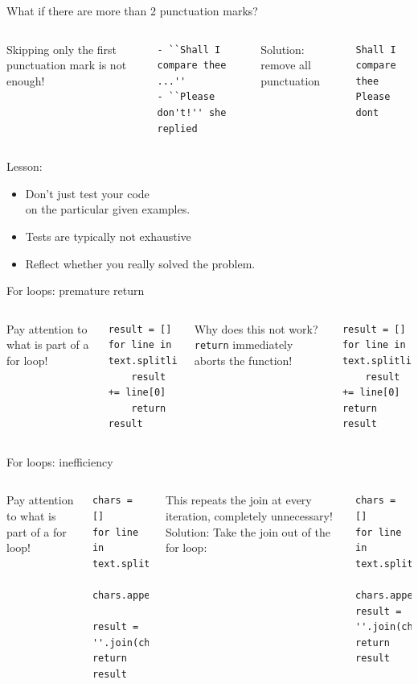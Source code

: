 \documentclass{beamer}
\begin{document}
\begin{frame}[fragile]{What if there are more than 2 punctuation marks?}
    \begin{columns}[T]
Skipping only the first punctuation mark is not enough!
\begin{lstlisting}[style=plain]
- ``Shall I compare thee ...''
- ``Please don't!'' she replied
\end{lstlisting} %
\pause{}
Solution: remove all punctuation
\begin{lstlisting}[style=plain]
Shall I compare thee
Please dont
\end{lstlisting}
\end{columns}
Lesson:
    \begin{itemize}
        \item Don't just test your code \\
            on the particular given examples.
        \item Tests are typically not exhaustive
        \item Reflect whether you really solved the problem.
    \end{itemize}
\end{frame}

\begin{frame}[fragile]{For loops: premature return}
\begin{columns}
Pay attention to what is part of a for loop!
\begin{lstlisting}
result = []
for line in text.splitlines():
    result += line[0]
    return result
\end{lstlisting}
Why does this not work?
\texttt{return} immediately aborts the function!
\pause{}
\begin{lstlisting}
result = []
for line in text.splitlines():
    result += line[0]
return result
\end{lstlisting}
\end{columns}
\end{frame}

\begin{frame}[fragile]{For loops: inefficiency}
\begin{columns}
Pay attention to what is part of a for loop!
\begin{lstlisting}
chars = []
for line in text.splitlines():
    chars.append(line[0])
    result = ''.join(chars)
return result
\end{lstlisting}
This repeats the join at every iteration, completely unnecessary!
\pause{}
Solution: Take the join out of the for loop:
\begin{lstlisting}
chars = []
for line in text.splitlines():
    chars.append(line[0])
result = ''.join(chars)
return result
\end{lstlisting}
\end{columns}
\end{frame}
\end{document}
